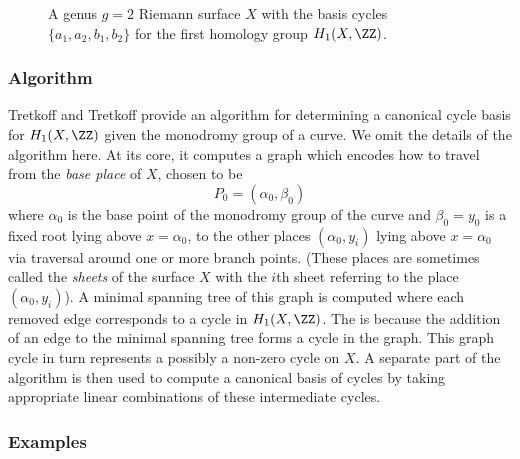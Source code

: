 \begin{figure}
  \caption{A genus $g=2$ Riemann surface $X$ with the basis cycles
    $\{a_1,a_2,b_1,b_2\}$ for the first homology group $H_1(X,\ZZ)$.}
  \label{fig: cycle-basis}
\end{figure}


%
\subsubsection*{Algorithm}
%

Tretkoff and Tretkoff \cite{TretkoffTretkoff84} provide an algorithm for
determining a canonical cycle basis for $H_1(X,\ZZ)$ given the monodromy
group of a curve. We omit the details of the algorithm here. At its
core, it computes a graph which encodes how to travel from the {\it base
  place} of $X$, chosen to be
\[
    P_0 = (\alpha_0, \beta_0)
\]
where $\alpha_0$ is the base point of the monodromy group of the curve
and $\beta_0 = y_0$ is a fixed root lying above $x = \alpha_0$, to the
other places $(\alpha_0, y_i)$ lying above $x = \alpha_0$ via traversal
around one or more branch points. (These places are sometimes called the
{\it sheets} of the surface $X$ with the $i$th sheet referring to the
place $(\alpha_0,y_i)$). A minimal spanning tree of this graph is
computed where each removed edge corresponds to a cycle in
$H_1(X,\ZZ)$. The is because the addition of an edge to the minimal
spanning tree forms a cycle in the graph. This graph cycle in turn
represents a possibly a non-zero cycle on $X$. A separate part of the
algorithm is then used to compute a canonical basis of cycles by taking
appropriate linear combinations of these intermediate cycles.

%
\subsubsection*{Examples}
%

